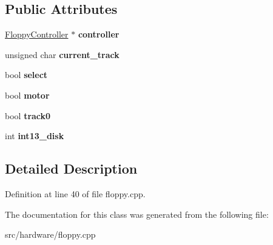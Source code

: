 \subsection*{Public Attributes}
\begin{DoxyCompactItemize}
\item 
\hypertarget{classFloppyDevice_a8ffa0135f4b836426a32b96680dc51a0}{\hyperlink{classFloppyController}{Floppy\-Controller} $\ast$ {\bfseries controller}}\label{classFloppyDevice_a8ffa0135f4b836426a32b96680dc51a0}

\item 
\hypertarget{classFloppyDevice_a34366d0b663e4c660875c22b1f7efa8b}{unsigned char {\bfseries current\-\_\-track}}\label{classFloppyDevice_a34366d0b663e4c660875c22b1f7efa8b}

\item 
\hypertarget{classFloppyDevice_a7af7286e2e7558074b0853a10a37d80f}{bool {\bfseries select}}\label{classFloppyDevice_a7af7286e2e7558074b0853a10a37d80f}

\item 
\hypertarget{classFloppyDevice_a00f5510f11e8fad3b0233c9d3b293fd7}{bool {\bfseries motor}}\label{classFloppyDevice_a00f5510f11e8fad3b0233c9d3b293fd7}

\item 
\hypertarget{classFloppyDevice_a81025c10fec2b1d3f39cba566c89d796}{bool {\bfseries track0}}\label{classFloppyDevice_a81025c10fec2b1d3f39cba566c89d796}

\item 
\hypertarget{classFloppyDevice_aea6d0c8cb2f60c2cc106b0c722d2f8de}{int {\bfseries int13\-\_\-disk}}\label{classFloppyDevice_aea6d0c8cb2f60c2cc106b0c722d2f8de}

\end{DoxyCompactItemize}


\subsection{Detailed Description}


Definition at line 40 of file floppy.\-cpp.



The documentation for this class was generated from the following file\-:\begin{DoxyCompactItemize}
\item 
src/hardware/floppy.\-cpp\end{DoxyCompactItemize}
